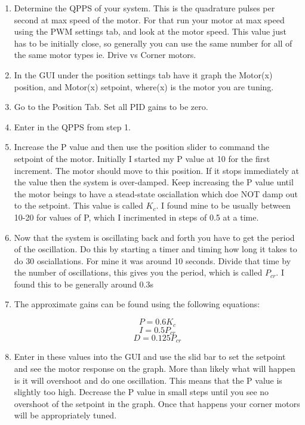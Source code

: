 \documentclass[12pt]{article}
\begin{document}
\begin{enumerate}

	\item Determine the QPPS of your system. This is the quadrature pulses per second at max speed of the motor. For that run your motor at max speed using the PWM settings tab, and look at the motor speed. This value just has to be initially close, so generally you can use the same number for all of the same motor types ie. Drive vs Corner motors.
	\item In the GUI under the position settings tab have it graph the Motor(x) position, and Motor(x) setpoint, where(x) is the motor you are tuning.
	\item Go to the Position Tab. Set all PID gains to be zero. 
	\item Enter in the QPPS from step 1.
	\item Increase the P value and then use the position slider to command the setpoint of the motor. Initially I started my P value at 10 for the first increment. The motor should move to this position. If it stops immediately at the value then the system is over-damped. Keep increasing the P value until the motor beings to have a stead-state osciallation which doe NOT damp out to the setpoint. This value is called $K_{c}$. I found mine to be usually between 10-20 for values of P, which I incrimented in steps of 0.5 at a time.
	\item Now that the system is oscillating back and forth you have to get the period of the oscillation. Do this by starting a timer and timing how long it takes to do 30 osciallations. For mine it was around 10 seconds. Divide that time by the number of oscillations, this gives you the period, which is called $P_{cr}$. I found this to be generally around 0.3s
	\item The approximate gains can be found using the following equations:

\begin{equation}
	P =  0.6 K_c 
\end{equation}
\begin{equation}
	I = 0.5 P_{cr}
\end{equation}
\begin{equation}
	D = 0.125 P_{cr}
\end{equation}

	\item Enter in these values into the GUI and use the slid bar to set the setpoint and see the motor response on the graph. More than likely what will happen is it will overshoot and do one oscillation. This means that the P value is slightly too high. Decrease the P value in small steps until you see no overshoot of the setpoint in the graph. Once that happens your corner motors will be appropriately tuned. 

\end{enumerate}
\end{document}
